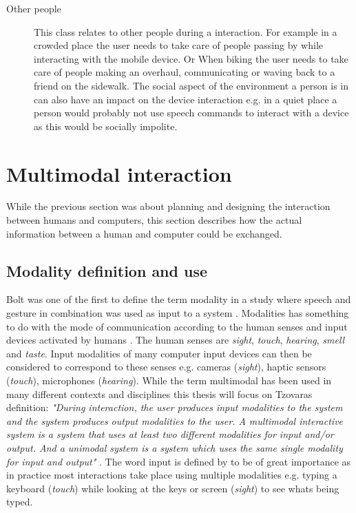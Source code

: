 \begin{description}
\item[Other people]
This class relates to other people during a interaction. For example in a crowded place the user needs to take care of people passing by while interacting with the mobile device. Or When biking the user needs to take care of people making an overhaul, communicating or waving back to a friend on the sidewalk. The social aspect of the environment a person is in can also have an impact on the device interaction e.g. in a quiet place a person would probably not use speech commands to interact with a device as this would be socially impolite.
\end{description}


\section{Multimodal interaction}
While the previous section was about planning and designing the interaction between humans and computers, this section describes how the actual information between a human and computer could be exchanged. 

\subsection{Modality definition and use}
Bolt was one of the first to define the term modality in a study where speech and gesture in combination was used as input to a system \cite{bolt_put-that-there:_1980}. Modalities has something to do with the mode of communication according to the human senses and input devices activated by humans \cite{jaimes_multimodal_2007,tzovaras_dimitrios_multimodal_2008}. The human senses are \textit{sight}, \textit{touch}, \textit{hearing}, \textit{smell} and \textit{taste}. Input modalities of many computer input devices can then be considered to correspond to these senses e.g. cameras (\textit{sight}), haptic sensors (\textit{touch}), microphones (\textit{hearing}). While the term multimodal has been used in many different contexts and disciplines this thesis will focus on Tzovaras definition: \textit{"During interaction, the user produces input modalities to the system and the system produces output modalities to the user. A multimodal interactive system is a system that uses at least two different modalities for input and/or output. And a unimodal system is a system which uses the same single modality for input and output"} \cite{tzovaras_dimitrios_multimodal_2008}. The word input is defined by \cite{jaimes_multimodal_2007} to be of great importance as in practice most interactions take place using multiple modalities e.g. typing a keyboard (\textit{touch}) while looking at the keys or screen (\textit{sight}) to see whats being typed.

